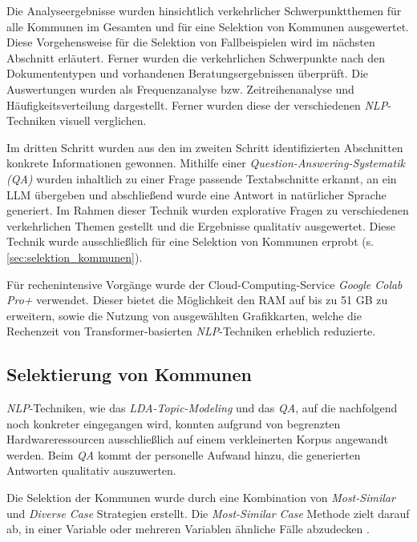 Die Analyseergebnisse wurden hinsichtlich verkehrlicher Schwerpunktthemen für alle Kommunen im Gesamten und für eine Selektion von Kommunen ausgewertet. Diese Vorgehensweise für die Selektion von Fallbeispielen wird im nächsten Abschnitt erläutert. Ferner wurden die verkehrlichen Schwerpunkte nach den Dokumententypen und vorhandenen Beratungsergebnissen überprüft. Die Auswertungen wurden als Frequenzanalyse bzw. Zeitreihenanalyse und Häufigkeitsverteilung dargestellt. Ferner wurden diese der verschiedenen \textit{NLP}-Techniken visuell verglichen.

Im dritten Schritt wurden aus den im zweiten Schritt identifizierten Abschnitten konkrete Informationen gewonnen. Mithilfe einer \textit{Question-Answering-Systematik (QA)} wurden inhaltlich zu einer Frage passende Textabschnitte erkannt, an ein LLM übergeben und abschließend wurde eine Antwort in natürlicher Sprache generiert. Im Rahmen dieser Technik wurden explorative Fragen zu verschiedenen verkehrlichen Themen gestellt und die Ergebnisse qualitativ ausgewertet. Diese Technik wurde ausschließlich für eine Selektion von Kommunen erprobt (s. \autoref{sec:selektion_kommunen}).

Für rechenintensive Vorgänge wurde der Cloud-Computing-Service \textit{Google Colab Pro+} verwendet. Dieser bietet die Möglichkeit den RAM auf bis zu 51 GB zu erweitern, sowie die Nutzung von ausgewählten Grafikkarten, welche die Rechenzeit von Transformer-basierten \textit{NLP}-Techniken erheblich reduzierte.


\subsection{Selektierung von Kommunen}\label{sec:selektion_kommunen}

\textit{NLP}-Techniken, wie das \textit{LDA-Topic-Modeling} und das \textit{QA}, auf die nachfolgend noch konkreter eingegangen wird, konnten aufgrund von begrenzten Hardwareressourcen ausschließlich auf einem verkleinerten Korpus angewandt werden. Beim \textit{QA} kommt der personelle Aufwand hinzu, die generierten Antworten qualitativ auszuwerten.

Die Selektion der Kommunen wurde durch eine Kombination von \textit{Most-Similar} und \textit{Diverse Case} Strategien erstellt. Die \textit{Most-Similar Case} Methode zielt darauf ab, in einer Variable oder mehreren Variablen ähnliche Fälle abzudecken \parencite[25]{gerring2009}. 

